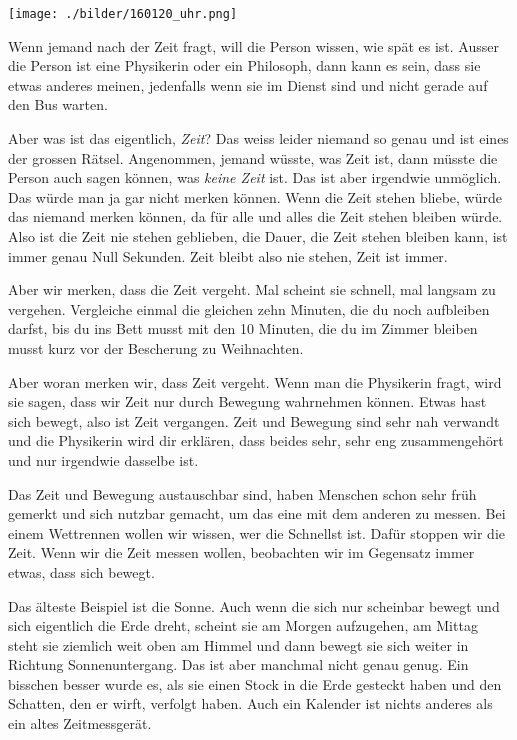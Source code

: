 \thispagestyle{empty}
\begin{center}
\texttt{[image: ./bilder/160120\_uhr.png]}
\end{center}
\vskip 2cm
{\Huge\color{farbe}\hfill{}}
\newpage
\lettrine[lines=2, lhang=.2, loversize=.25, lraise=0.05, findent=0.1em, nindent=0em]{W}{}enn jemand nach der Zeit fragt, will die Person wissen,
wie spät es ist. Ausser die Person ist eine Physikerin oder ein Philosoph, dann
kann es sein, dass sie etwas anderes meinen, jedenfalls wenn sie im Dienst sind
und nicht gerade auf den Bus warten.

Aber was ist das eigentlich, \textit{Zeit}? Das weiss leider niemand so genau
und ist eines der grossen Rätsel. Angenommen, jemand wüsste, was Zeit ist, dann
müsste die Person auch sagen können, was \textit{keine Zeit} ist. Das ist aber
irgendwie unmöglich. Das würde man ja gar nicht merken können. Wenn die Zeit
stehen bliebe, würde das niemand merken können, da für alle und alles die Zeit
stehen bleiben würde. Also ist die Zeit nie stehen geblieben, die Dauer, die
Zeit stehen bleiben kann, ist immer genau Null Sekunden. Zeit bleibt also nie
stehen, Zeit ist immer.

Aber wir merken, dass die Zeit vergeht. Mal scheint sie schnell, mal langsam zu
vergehen. Vergleiche einmal die gleichen zehn Minuten, die du noch aufbleiben
darfst, bis du ins Bett musst mit den 10 Minuten, die du im Zimmer bleiben
musst kurz vor der Bescherung zu Weihnachten.

Aber woran merken wir, dass Zeit vergeht. Wenn man die Physikerin fragt, wird
sie sagen, dass wir Zeit nur durch Bewegung wahrnehmen können. Etwas hast sich
bewegt, also ist Zeit vergangen. Zeit und Bewegung sind sehr nah verwandt und
die Physikerin wird dir erklären, dass beides sehr, sehr eng zusammengehört und
nur irgendwie dasselbe ist.

Das Zeit und Bewegung austauschbar sind, haben Menschen schon sehr früh gemerkt
und sich nutzbar gemacht, um das eine mit dem anderen zu messen. Bei einem
Wettrennen wollen wir wissen, wer die Schnellst ist. Dafür stoppen wir die
Zeit. Wenn wir die Zeit messen wollen, beobachten wir im Gegensatz immer etwas,
dass sich bewegt.

Das älteste Beispiel ist die Sonne. Auch wenn die sich nur scheinbar bewegt und
sich eigentlich die Erde dreht, scheint sie am Morgen aufzugehen, am Mittag
steht sie ziemlich weit oben am Himmel und dann bewegt sie sich weiter in
Richtung Sonnenuntergang. Das ist aber manchmal nicht genau genug. Ein bisschen
besser wurde es, als sie einen Stock in die Erde gesteckt haben und den
Schatten, den er wirft, verfolgt haben. Auch ein Kalender ist nichts anderes
als ein altes Zeitmessgerät.

